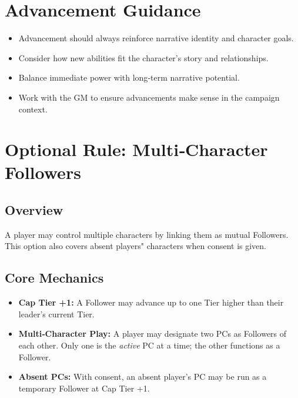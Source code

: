 \section{Advancement Guidance}\label{sec:advancement_guidance}

\begin{itemize}
    \item Advancement should always reinforce narrative identity and character goals.
    \item Consider how new abilities fit the character's story and relationships.
    \item Balance immediate power with long‑term narrative potential.
    \item Work with the GM to ensure advancements make sense in the campaign context.
\end{itemize}

\section{Optional Rule: Multi‑Character Followers}\label{sec:multi_character_followers}

\subsection{Overview}
A player may control multiple characters by linking them as mutual Followers. This option also covers absent players" characters when consent is given.

\subsection{Core Mechanics}
\begin{itemize}
    \item \textbf{Cap Tier +1:} A Follower may advance up to one Tier higher than their leader's current Tier.
    \item \textbf{Multi‑Character Play:} A player may designate two PCs as Followers of each other. Only one is the \emph{active} PC at a time; the other functions as a Follower.
    \item \textbf{Absent PCs:} With consent, an absent player's PC may be run as a temporary Follower at Cap Tier +1.
\end{itemize}

